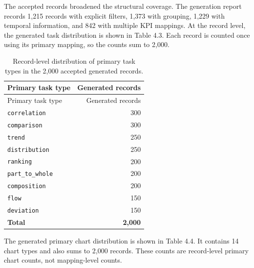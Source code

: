 The accepted records broadened the structural coverage. The generation report records 1,215 records with explicit filters, 1,373 with grouping, 1,229 with temporal information, and 842 with multiple KPI mappings. At the record level, the generated task distribution is shown in Table 4.3. Each record is counted once using its primary mapping, so the counts sum to 2,000.

\begingroup\footnotesize\setlength{\tabcolsep}{3pt}\sloppy
\begin{longtable}[]{@{}lr@{}}
\caption{Record-level distribution of primary task types in the 2,000 accepted generated records.}\tabularnewline
\toprule\noalign{}
Primary task type & Generated records \\
\midrule\noalign{}
\endfirsthead
\toprule\noalign{}
Primary task type & Generated records \\
\midrule\noalign{}
\endhead
\bottomrule\noalign{}
\endlastfoot
\texttt{correlation} & 300 \\
\texttt{comparison} & 300 \\
\texttt{trend} & 250 \\
\texttt{distribution} & 250 \\
\texttt{ranking} & 200 \\
\texttt{part\_to\_whole} & 200 \\
\texttt{composition} & 200 \\
\texttt{flow} & 150 \\
\texttt{deviation} & 150 \\
\textbf{Total} & \textbf{2,000} \\
\end{longtable}
\endgroup

The generated primary chart distribution is shown in Table 4.4. It contains 14 chart types and also sums to 2,000 records. These counts are record-level primary chart counts, not mapping-level counts.

